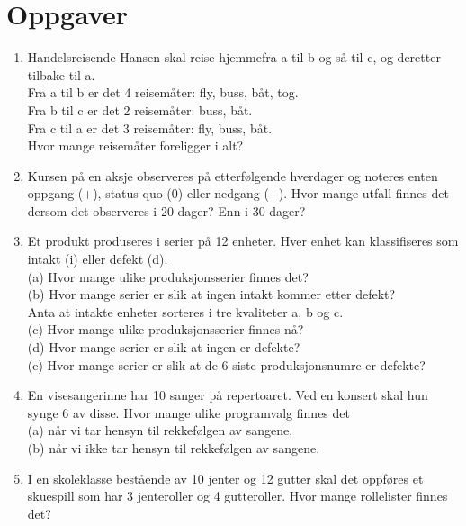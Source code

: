 \section{Oppgaver}
\small
\begin{enumerate}
\item   Handelsreisende Hansen skal reise hjemmefra a til b  og så
     til c, og deretter tilbake til a. \\
     Fra a til b er det 4 reisemåter: fly, buss, båt, tog.\\
     Fra b til c er det 2 reisemåter: buss, båt.\\
     Fra c til a er det 3 reisemåter: fly, buss, båt.\\
     Hvor mange reisemåter foreligger i alt?

\item  Kursen på en aksje observeres på etterfølgende hverdager og
     noteres enten oppgang (+), status quo (0) eller nedgang ($-$).
     Hvor mange utfall finnes det dersom det observeres i 20
     dager? Enn i 30 dager?

\item  Et produkt produseres i serier på 12 enheter. Hver enhet kan
     klassifiseres som intakt (i) eller defekt (d).\\
     (a)  Hvor mange ulike produksjonsserier finnes det?\\
     (b)  Hvor mange serier er slik at ingen intakt kommer etter
          defekt?\\
     Anta at intakte enheter sorteres i tre kvaliteter a, b og c.\\
     (c)  Hvor mange ulike produksjonsserier finnes nå?\\
     (d)  Hvor mange serier er slik at ingen er defekte?\\
     (e)  Hvor mange serier er slik at de 6 siste     
     produksjonsnumre er defekte?\\

\item  En visesangerinne har 10 sanger på repertoaret. Ved en konsert
     skal hun synge 6 av disse. Hvor mange ulike programvalg
     finnes det \\
     (a)  når vi tar hensyn til rekkefølgen av sangene,\\
     (b)  når vi ikke tar hensyn til rekkefølgen av sangene.

\item I en skoleklasse bestående av 10 jenter og 12 gutter skal
     det oppføres et skuespill som har 3 jenteroller og 4
     gutteroller. Hvor mange rollelister finnes det?


\end{enumerate}
